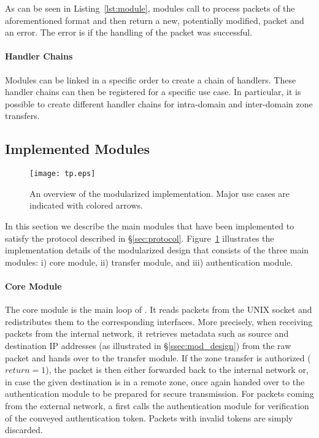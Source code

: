 As can be seen in Listing~\ref{lst:module}, modules call  to process packets
of the aforementioned format and then return a new, potentially modified, packet and an
error. The error is  if the handling of the packet was successful.

\paragraph{Handler Chains}
\label{ssec:chains}

Modules can be linked in a specific order to create a chain of handlers.
These handler chains can then be registered for a specific use case. In particular, it is possible
to create different handler chains for intra-domain and inter-domain zone transfers.

\subsection{Implemented Modules}
\label{ssec:modules}

\begin{figure}[htb]
	\begin{center}
		\texttt{[image: tp.eps]}
	\end{center}
	\caption{An overview of the modularized \tp implementation. Major use cases are
		indicated with colored arrows.}
	\label{fig:tp}
\end{figure}

In this section we describe the main modules that have been implemented to satisfy
the protocol described in \S\ref{sec:protocol}. Figure~\ref{fig:tp} illustrates
the implementation details of the modularized \tp design that consists of the three
main modules: i) core module, ii) transfer module, and iii) authentication module.

\paragraph{Core Module}
The core module is the main loop of \tp. It reads packets from the UNIX socket and
redistributes them to the corresponding interfaces. More precisely, when receiving packets
from the internal network, it retrieves metadata such as source and destination
IP addresses (as illustrated in
\S\ref{ssec:mod_design}) from the raw packet and hands over to the transfer module.
If the zone transfer is authorized ($return=1$),
the packet is then either forwarded back to the internal network or, in case the given destination
is in a remote zone,
once again handed over to the authentication module to be prepared for secure transmission.
For packets coming from the external network, a \tp first calls the authentication module for
verification of the conveyed authentication token. Packets with invalid tokens are simply discarded.

